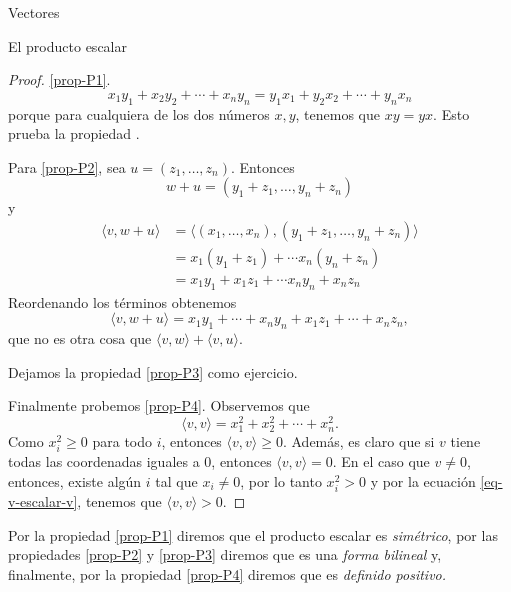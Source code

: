 \begin{chapter}{Vectores}
\begin{section}{El producto escalar}
\begin{proof}
            \ref{prop-P1}.
        \begin{equation*}
            x_1y_1 + x_2y_2+\cdots+x_ny_n = y_1x_1 + y_2x_2+\cdots+y_nx_n
        \end{equation*}
        porque para cualquiera de los dos números $x, y$, tenemos que $xy=yx$. Esto prueba la propiedad . 
        
        Para \ref{prop-P2}, sea $u = (z_1, \ldots, z_n)$. Entonces
        \begin{equation*}
            w + u = (y_1+z_1, \ldots, y_n+ z_n)
        \end{equation*}
        y
        \begin{align*}
            \langle v , w + u \rangle &= \langle (x_1, \ldots,x_n) , (y_1+z_1, \ldots, y_n+ z_n) \rangle\\
            &= x_1(y_1+z_1) + \cdots x_n(y_n+z_n) \\
            &= x_1y_1+x_1z_1 + \cdots x_ny_n+x_nz_n
        \end{align*}
        Reordenando los términos obtenemos
        \begin{equation*}
                \langle v , w + u \rangle =  x_1y_1+\cdots +  x_ny_n +x_1z_1 + \cdots+x_nz_n,
        \end{equation*}
        que no es otra cosa que $\langle v , w \rangle + \langle v , u \rangle$.
        
        Dejamos la propiedad \ref{prop-P3} como ejercicio.
        
        Finalmente probemos \ref{prop-P4}. Observemos que 
        \begin{equation}\label{eq-v-escalar-v}
            \langle v , v \rangle = x_1^2 + x_2^2 + \cdots + x_n^2.
        \end{equation}
        Como $x_i^2 \ge 0$ para todo $i$,  entonces $\langle v , v \rangle \ge 0$. Además, es claro que si $v$ tiene todas las coordenadas iguales a 0,  entonces  $\langle v , v \rangle =0$. En  el caso que $v\not=0$, entonces,  existe algún $i$  tal que  $x_i \ne 0$, por lo tanto $x_i^2>0$ y por la ecuación \eqref{eq-v-escalar-v}, tenemos que  $\langle v , v \rangle>0$.
    \end{proof}

        Por  la propiedad \ref{prop-P1} diremos que el producto escalar es \textit{simétrico}, por las propiedades  \ref{prop-P2} y \ref{prop-P3} diremos que es una \textit{forma bilineal} y, finalmente, por la propiedad \ref{prop-P4} diremos que es \textit{definido positivo.} 
        

\end{section}
\end{chapter}
